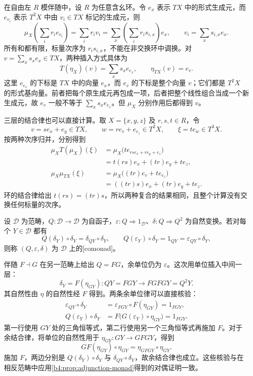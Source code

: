 在自由左 \(R\) 模伴随中，设 \(R\) 为任意含幺环。令 \(e_x\) 表示 \(TX\) 中的形式生成元，而 \(e_{v_i}\) 表示 \(T^2X\) 中由 \(v_i\in TX\) 标记的生成元，则
\[
	\mu_X\left(\sum_i r_i e_{v_i}\right) =\sum_i r_iv_i =\sum_x\left(\sum_i r_is_{i,x}\right)e_x, \qquad v_i=\sum_xs_{i,x}e_x.
\]
所有和都有限，标量次序为 \(r_is_{i,x}\)，不能在非交换环中调换。对 \(v=\sum_xs_xe_x\in TX\)，两种插入方式具体为
\[
	T(\eta_X)(v)=\sum_xs_xe_{e_x},\qquad \eta_{TX}(v)=e_v.
\]
这里 \(e_{e_x}\) 的下标是 \(TX\) 中的向量 \(e_x\)，而 \(e_v\) 的下标是整个向量 \(v\)；它们都是 \(T^2X\) 的形式基向量。前者把每个原生成元再包成一项，后者把整个线性组合当成一个新生成元，故 \(e_v\) 一般不等于 \(\sum_xs_xe_{e_x}\)。但 \(\mu_X\) 分别作用后都得到 \(v\)。

\ProseParagraphBreak
三层的结合律也可以直接计算。取 \(X=\{x,y,z\}\) 及 \(r,s,t\in R\)，令
\[
	v=s e_x+e_y\in TX,\qquad w=r e_v+e_{e_z}\in T^2X,\qquad \xi=t e_w\in T^3X.
\]
按两种次序归并，分别得到
\[
	\begin{aligned}
		\mu_XT(\mu_X)(\xi) &=\mu_X\bigl(t e_{rs e_x+r e_y+e_z}\bigr)\\
		&=t(rs)e_x+(tr)e_y+t e_z,\\
		\mu_X\mu_{TX}(\xi) &=\mu_X\bigl((tr)e_v+t e_{e_z}\bigr)\\
		&=((tr)s)e_x+(tr)e_y+t e_z.
	\end{aligned}
\]
环的结合律给出 \(t(rs)=(tr)s\)，所以两种复合的结果相同，且整个计算没有交换任何标量的次序。

\begin{definition}\label{b4:def:comonad}
	设 \(\mathcal D\) 为范畴，\(Q:\mathcal D\rightarrow\mathcal D\) 为自函子，\(\varepsilon:Q\Rightarrow1_{\mathcal D}\)、\(\delta:Q\Rightarrow Q^2\) 为自然变换。若对每个 \(Y\in\mathcal D\) 都有
	\[
		Q(\delta_Y)\circ\delta_Y=\delta_{QY}\circ\delta_Y, \qquad Q(\varepsilon_Y)\circ\delta_Y=1_{QY} =\varepsilon_{QY}\circ\delta_Y,
	\]
	则称 \((Q,\varepsilon,\delta)\) 为 \(\mathcal D\) 上的[comonad]。
\end{definition}

伴随 \(F\dashv G\) 在另一范畴上给出 \(Q=FG\)，余单位仍为 \(\varepsilon\)。这次用单位插入中间一层：
\[
	\delta_Y=F(\eta_{GY}):QY=FGY\longrightarrow FGFGY=Q^2Y.
\]
其自然性由 \(\eta\) 的自然性经 \(F\) 得到。两条余单位律可以直接核验：
\[
	\begin{aligned}
		\varepsilon_{QY}\circ\delta_Y &=\varepsilon_{FGY}\circ F(\eta_{GY})=1_{FGY},\\
		Q(\varepsilon_Y)\circ\delta_Y &=F\bigl(G(\varepsilon_Y)\circ\eta_{GY}\bigr)=1_{FGY}.
	\end{aligned}
\]
第一行使用 \(GY\) 处的三角恒等式，第二行使用另一个三角恒等式再施加 \(F\)。对于余结合律，将单位的自然性用于 \(\eta_{GY}:GY\rightarrow GFGY\)，得到
\[
	GF(\eta_{GY})\circ\eta_{GY} =\eta_{GFGY}\circ\eta_{GY}.
\]
施加 \(F\)，两边分别是 \(Q(\delta_Y)\circ\delta_Y\) 与 \(\delta_{QY}\circ\delta_Y\)，故余结合律也成立。这些核验与在相反范畴中应用\cref{b4:prop:adjunction-monad}得到的对偶证明一致。

